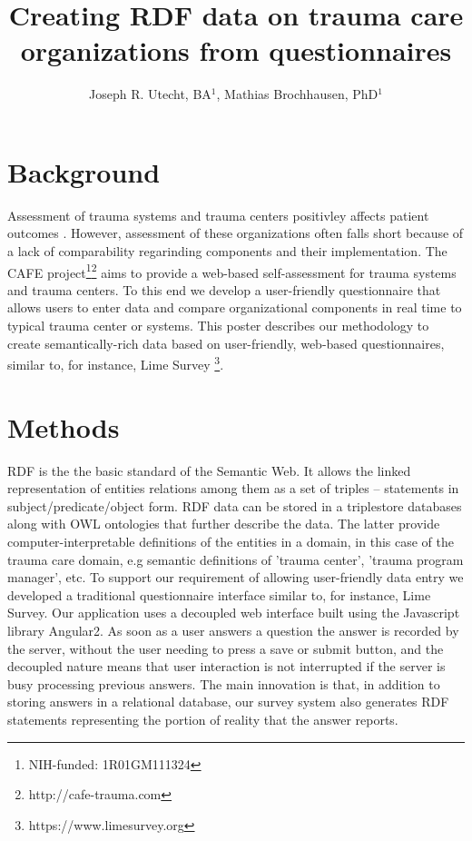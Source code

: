 \documentclass{amia}
\begin{document}
\title{Creating RDF data on trauma care organizations from questionnaires}

\author{Joseph R. Utecht, BA$^{1}$, Mathias Brochhausen, PhD$^{1}$}


\maketitle

\section*{Background}

Assessment of trauma systems and trauma centers positivley affects patient outcomes \cite{ref1, ref2}.
However, assessment of these organizations often falls short because of a lack of comparability regarinding components and their implementation.
The CAFE project\footnote{NIH-funded: 1R01GM111324}\footnote{http://cafe-trauma.com} aims to provide a web-based self-assessment for trauma systems and trauma centers. 
To this end we develop a user-friendly questionnaire that allows users to enter data and compare organizational components in real time to typical trauma center or systems.
This poster describes our methodology to create semantically-rich data based on user-friendly, web-based questionnaires, similar to, for instance, Lime Survey \footnote{https://www.limesurvey.org}. 

\section*{Methods}
RDF is the the basic standard of the Semantic Web. It allows the linked representation of entities relations among them as a set of triples -- statements in subject/predicate/object form. RDF data can be stored in a triplestore databases along with OWL ontologies that further describe the data. The latter provide computer-interpretable definitions of the entities in  a domain, in this case of the trauma care domain, e.g semantic definitions of 'trauma center', 'trauma program manager', etc. 
To support our requirement of allowing user-friendly data entry we developed a traditional questionnaire interface similar to, for instance, Lime Survey\cite{TODO}. 
Our application uses a decoupled web interface built using the Javascript library Angular2\cite{TODO}.
As soon as a user answers a question the answer is recorded by the server, without the user needing to press a save or submit button, and the decoupled nature means that user interaction is not interrupted if the server is busy processing previous answers.
The main innovation is that, in addition to storing answers in a relational database, our survey system also generates RDF statements representing the portion of reality that the answer reports.
\end{document}
